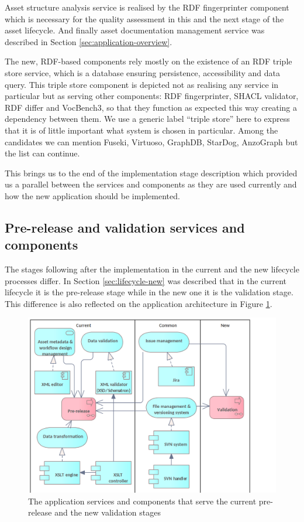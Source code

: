 	Asset structure analysis service is realised by the RDF fingerprinter component which is necessary for the quality assessment in this and the next stage of the asset lifecycle. And finally asset documentation management service was described in Section \ref{sec:application-overview}. 
	
	The new, RDF-based components rely mostly on the existence of an RDF triple store service, which is a database ensuring persistence, accessibility and data query. This triple store component is depicted not as realising any service in particular but as serving other components: RDF fingerprinter, SHACL validator, RDF differ and VocBench3, so that they function as expected this way creating a dependency between them. We use a generic label ``triple store'' here to express that it is of little important what system is chosen in particular. Among the candidates we can mention Fuseki, Virtuoso, GraphDB, StarDog, AnzoGraph but the list can continue. 
	
	This brings us to the end of the implementation stage description which provided us a parallel between the services and components as they are used currently and how the new application should be implemented. 
	
	\subsection{Pre-release and validation services and components}
	\label{sec:validation-application}
	
	The stages following after the implementation in the current and the new lifecycle processes differ. In Section \ref{sec:lifecycle-new} was described that in the current lifecycle it is the pre-release stage while in the new one it is the validation stage. This difference is also reflected on the application architecture in Figure \ref{fig:application-validation}.
	
	\begin{figure}[h]
		\centering
		\includegraphics[width=.9\textwidth]{images/application/Validation & Pre-release v3.png}
		\caption{The application services and components that serve the current pre-release and the new validation stages}
		\label{fig:application-validation}
	\end{figure}
	
